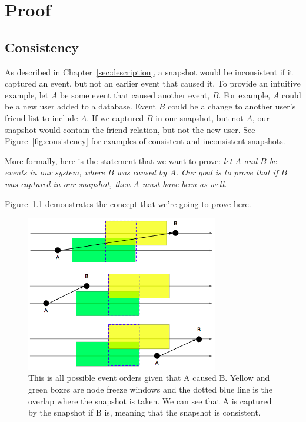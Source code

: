 \chapter{Proof}
\label{sec:proof}


\section{Consistency}

As described in Chapter~\ref{sec:description}, a snapshot would be
inconsistent if it captured an event, but not an earlier event that
caused it. To provide an intuitive example, let $A$ be some event that
caused another event, $B$.  For example, $A$ could be a new user added
to a database. Event $B$ could be a change to another user's friend
list to include $A$. If we captured $B$ in our snapshot, but not $A$,
our snapshot would contain the friend relation, but not the new
user. See Figure~\ref{fig:consistency} for examples of consistent and
inconsistent snapshots.

More formally, here is the statement that we want to prove: {\em let
  $A$ and $B$ be events in our system, where $B$ was caused by
  $A$. Our goal is to prove that if $B$ was captured in our snapshot,
  then $A$ must have been as well.}

Figure~\ref{fig:consistentoverlap} demonstrates the concept that we're
going to prove here.

\begin{figure}[!htbp]
  \centering
  \caption{This is all possible event orders given that A caused B. Yellow and green boxes are node freeze windows and the dotted blue line is the overlap where the snapshot is taken. We can see that A is captured by the snapshot if B is, meaning that the snapshot is consistent.} 
  \label{fig:consistentoverlap}
  \includegraphics[width=0.75\textwidth]{consistentoverlap.png}
\end{figure}

